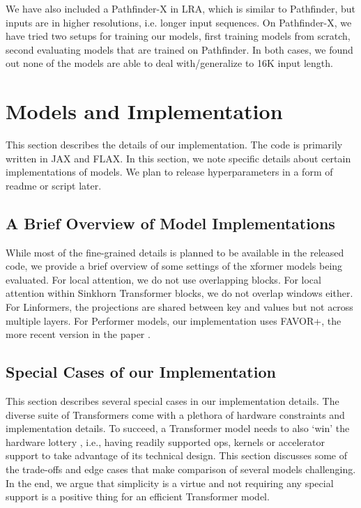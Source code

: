 \documentclass{article} \usepackage{iclr2021_conference,times}
\begin{document}
We have also included a Pathfinder-X in LRA, which is similar to Pathfinder, but inputs are in higher resolutions, i.e. longer input sequences. On Pathfinder-X, we have tried two setups for training our models, first training models from scratch, second evaluating models that are trained on Pathfinder. In both cases, we found out none of the models are able to deal with/generalize to 16K input length.  

\section{Models and Implementation}
This section describes the details of our implementation. The code is primarily written in JAX and FLAX. In this section, we note specific details about certain implementations of models. We plan to release hyperparameters in a form of readme or script later.

\subsection{A Brief Overview of Model Implementations}
While most of the fine-grained details is planned to be available in the released code, we provide a brief overview of some settings of the xformer models being evaluated. For local attention, we do not use overlapping blocks. For local attention within Sinkhorn Transformer blocks, we do not overlap windows either. For Linformers, the projections are shared between key and values but not across multiple layers. For Performer models, our implementation uses FAVOR+, the more recent version in the paper \cite{choromanski2020rethinking}. 

\subsection{Special Cases of our Implementation}
This section describes several special cases in our implementation details. The diverse suite of Transformers come with a plethora of hardware constraints and implementation details. To succeed, a Transformer model needs to also `win' the hardware lottery \citep{hooker2020hardware}, i.e., having readily supported ops, kernels or accelerator support to take advantage of its technical design. This section discusses some of the trade-offs and edge cases that make comparison of several models challenging. In the end, we argue that simplicity is a virtue and not requiring any special support is a positive thing for an efficient Transformer model.
\end{document}
